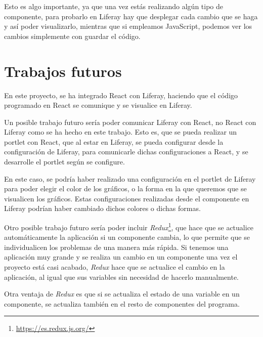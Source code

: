 \documentclass[a4paper, 12pt]{book}
\begin{document}
Esto es algo importante, ya que una vez estás realizando algún tipo de componente, para probarlo en Liferay hay que desplegar cada cambio que se haga y así poder visualizarlo, mientras que si empleamos JavaScript, podemos ver los cambios simplemente con guardar el código.

 
\section{Trabajos futuros}
\label{sec:trabajos_futuros}
En este proyecto, se ha integrado React con Liferay, haciendo que el código programado en React se comunique y se visualice en Liferay.

Un posible trabajo futuro sería poder comunicar Liferay con React, no React con Liferay como se ha hecho en este trabajo. Esto es, que se pueda realizar un portlet con React, que al estar en Liferay, se pueda configurar desde la configuración de Liferay, para comunicarle dichas configuraciones a React, y se desarrolle el portlet según se configure.

En este caso, se podría haber realizado una configuración en el portlet de Liferay para poder elegir el color de los gráficos, o la forma en la que queremos que se visualicen los gráficos. Estas configuraciones realizadas desde el componente en Liferay podrían haber cambiado dichos colores o dichas formas.

\vspace{5mm}
Otro posible trabajo futuro sería poder incluir \textit{Redux}\footnote{\url{https://es.redux.js.org/}}, que hace que se actualice automáticamente la aplicación si un componente cambia, lo que permite que se individualicen los problemas de una manera más rápida. Si tenemos una aplicación muy grande y se realiza un cambio en un componente una vez el proyecto está casi acabado, \textit{Redux} hace que se actualice el cambio en la aplicación, al igual que sus variables sin necesidad de hacerlo manualmente.

Otra ventaja de \textit{Redux} es que si se actualiza el estado de una variable en un componente, se actualiza también en el resto de componentes del programa.



\cleardoublepage
\appendix
\end{document}
